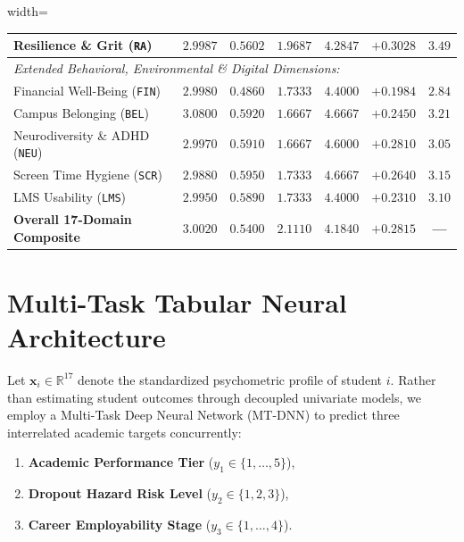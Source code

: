 \documentclass[twocolumn,10pt,a4paper]{article}
\begin{document}
\begin{table}[htbp]
\begin{adjustbox}{width=\columnwidth}
\begin{tabular}{lcccccc}
Resilience \& Grit (\texttt{RA}) & $2.9987$ & $0.5602$ & $1.9687$ & $4.2847$ & $+0.3028$ & $3.49$ \\
\midrule
\multicolumn{7}{l}{\textit{Extended Behavioral, Environmental \& Digital Dimensions:}} \\
Financial Well-Being (\texttt{FIN}) & $2.9980$ & $0.4860$ & $1.7333$ & $4.4000$ & $+0.1984$ & $2.84$ \\
Campus Belonging (\texttt{BEL}) & $3.0800$ & $0.5920$ & $1.6667$ & $4.6667$ & $+0.2450$ & $3.21$ \\
Neurodiversity \& ADHD (\texttt{NEU}) & $2.9970$ & $0.5910$ & $1.6667$ & $4.6000$ & $+0.2810$ & $3.05$ \\
Screen Time Hygiene (\texttt{SCR}) & $2.9880$ & $0.5950$ & $1.7333$ & $4.6667$ & $+0.2640$ & $3.15$ \\
LMS Usability (\texttt{LMS}) & $2.9950$ & $0.5890$ & $1.7333$ & $4.4000$ & $+0.2310$ & $3.10$ \\
\midrule
\textbf{Overall 17-Domain Composite} & \textbf{$3.0020$} & \textbf{$0.5400$} & \textbf{$2.1110$} & \textbf{$4.1840$} & \textbf{$+0.2815$} & \textbf{---} \\
\bottomrule
\end{tabular}
\end{adjustbox}
\end{table}

\FloatBarrier

\section{Multi-Task Tabular Neural Architecture}
\label{sec:models}
Let $\mathbf{x}_i \in \mathbb{R}^{17}$ denote the standardized psychometric profile of student $i$. Rather than estimating student outcomes through decoupled univariate models, we employ a Multi-Task Deep Neural Network (MT-DNN) to predict three interrelated academic targets concurrently:
\begin{enumerate}
    \item \textbf{Academic Performance Tier} ($y_1 \in \{1,\dots,5\}$),
    \item \textbf{Dropout Hazard Risk Level} ($y_2 \in \{1, 2, 3\}$),
    \item \textbf{Career Employability Stage} ($y_3 \in \{1,\dots,4\}$).
\end{enumerate}
\end{document}
